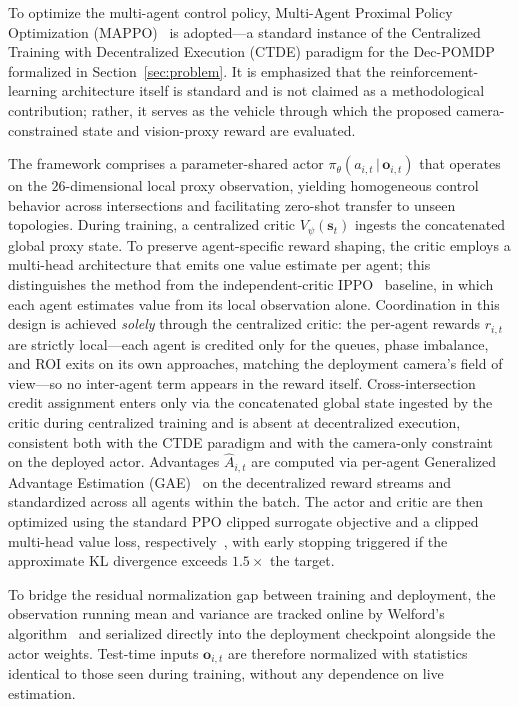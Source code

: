 To optimize the multi-agent control policy, Multi-Agent Proximal Policy Optimization
(MAPPO)~\cite{yu2022_mappo} is adopted---a standard instance of the Centralized Training
with Decentralized Execution (CTDE) paradigm for the Dec-POMDP~\cite{oliehoek2016_decpomdp}
formalized in Section~\ref{sec:problem}. It is emphasized that the reinforcement-learning architecture
itself is standard and is not claimed as a methodological contribution; rather, it serves
as the vehicle through which the proposed camera-constrained state and vision-proxy reward
are evaluated.

The framework comprises a parameter-shared actor $\pi_\theta(a_{i,t}\,|\,\mathbf{o}_{i,t})$
that operates on the $26$-dimensional local proxy observation, yielding homogeneous control
behavior across intersections and facilitating zero-shot transfer to unseen topologies.
During training, a centralized critic $V_\psi(\mathbf{s}_t)$ ingests the concatenated global
proxy state. To preserve agent-specific reward shaping, the critic employs a multi-head
architecture that emits one value estimate per agent; this distinguishes the method from
the independent-critic IPPO~\cite{dewitt2020_ippo} baseline, in which each agent estimates
value from its local observation alone. Coordination in this design is achieved
\emph{solely} through the centralized critic: the per-agent rewards $r_{i,t}$ are strictly
local---each agent is credited only for the queues, phase imbalance, and ROI exits on its own
approaches, matching the deployment camera's field of view---so no inter-agent term appears in
the reward itself. Cross-intersection credit assignment enters only via the concatenated global
state ingested by the critic during centralized training and is absent at decentralized
execution, consistent both with the CTDE paradigm and with the camera-only constraint on the
deployed actor. Advantages $\hat{A}_{i,t}$ are computed via per-agent Generalized Advantage Estimation
(GAE)~\cite{schulman2016_gae} on the decentralized reward streams and standardized across all
agents within the batch. The actor and critic are then optimized using the standard PPO clipped
surrogate objective and a clipped multi-head value loss, respectively~\cite{schulman2017_ppo},
with early stopping triggered if the approximate KL divergence exceeds $1.5\times$ the target.

To bridge the residual normalization gap between training and deployment, the observation
running mean and variance are tracked online by Welford's algorithm~\cite{welford1962} and
serialized directly into the deployment checkpoint alongside the actor weights. Test-time
inputs $\mathbf{o}_{i,t}$ are therefore normalized with statistics identical to those seen
during training, without any dependence on live estimation.